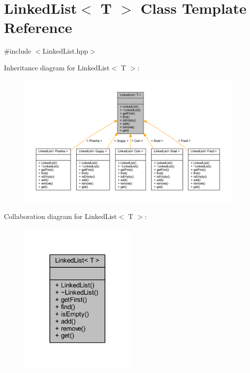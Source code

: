 \hypertarget{class_linked_list}{}\section{Linked\+List$<$ T $>$ Class Template Reference}
\label{class_linked_list}


{\ttfamily \#include $<$Linked\+List.\+hpp$>$}



Inheritance diagram for Linked\+List$<$ T $>$\+:
\nopagebreak
\begin{figure}[H]
\begin{center}
\leavevmode
\includegraphics[width=350pt]{class_linked_list__inherit__graph}
\end{center}
\end{figure}


Collaboration diagram for Linked\+List$<$ T $>$\+:
\nopagebreak
\begin{figure}[H]
\begin{center}
\leavevmode
\includegraphics[width=164pt]{class_linked_list__coll__graph}
\end{center}
\end{figure}
